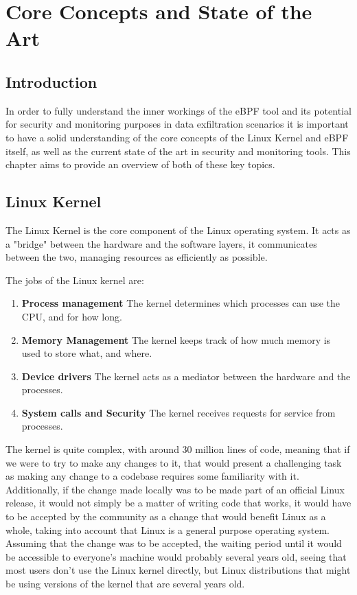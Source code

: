 \chapter{Core Concepts and State of the Art}

\section{Introduction}

In order to fully understand the inner workings of the eBPF tool and its potential for security and monitoring purposes in data exfiltration scenarios it is important to have a solid understanding of the core concepts of the Linux Kernel and eBPF itself, as well as the current state of the art in security and monitoring tools.
This chapter aims to provide an overview of both of these key topics.



\section{Linux Kernel}
The Linux Kernel is the core component of the Linux operating system. It acts as a "bridge" between the hardware and the software layers, it communicates between the two, managing resources as efficiently as possible. 

The jobs of the Linux kernel are:
\begin{enumerate}
    \item \textbf{Process management}
        The kernel determines which processes can use the CPU, and for how long.
    \item \textbf{Memory Management}
        The kernel keeps track of how much memory is used to store what, and where.
    \item \textbf{Device drivers}
        The kernel acts as a mediator between the hardware and the processes.
    \item \textbf{System calls and Security}
        The kernel receives requests for service from processes.
\end{enumerate}


The kernel is quite complex, with around 30 million lines of code, meaning that if we were to try to make any changes to it, that would present a challenging task as making any change to a codebase requires some familiarity with it. Additionally, if the change made locally was to be made part of an official Linux release, it would not simply be a matter of writing code that works, it would have to be accepted by the community as a change that would benefit Linux as a whole, taking into account that Linux is a general purpose operating system. Assuming that the change was to be accepted, the waiting period until it would be accessible to everyone's machine would probably several years old, seeing that most users don't use the Linux kernel directly, but Linux distributions that might be using versions of the kernel that are several years old.

